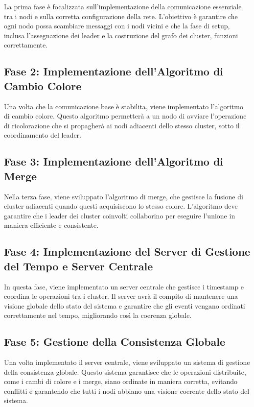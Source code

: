 \documentclass[12pt, a4paper]{report}
\begin{document}
La prima fase \`e focalizzata sull'implementazione della comunicazione essenziale tra i nodi e sulla corretta configurazione della rete. L'obiettivo \`e garantire che ogni nodo possa scambiare messaggi con i nodi vicini e che la fase di setup, inclusa l'assegnazione dei leader e la costruzione del grafo dei cluster, funzioni correttamente.

\subsection*{Fase 2: Implementazione dell'Algoritmo di Cambio Colore}

Una volta che la comunicazione base \`e stabilita, viene implementato l'algoritmo di cambio colore. Questo algoritmo permetter\`a a un nodo di avviare l'operazione di ricolorazione che si propagher\`a ai nodi adiacenti dello stesso cluster, sotto il coordinamento del leader.

\subsection*{Fase 3: Implementazione dell'Algoritmo di Merge}

Nella terza fase, viene sviluppato l'algoritmo di merge, che gestisce la fusione di cluster adiacenti quando questi acquisiscono lo stesso colore. L'algoritmo deve garantire che i leader dei cluster coinvolti collaborino per eseguire l'unione in maniera efficiente e consistente.

\subsection*{Fase 4: Implementazione del Server di Gestione del Tempo e Server Centrale}

In questa fase, viene implementato un server centrale che gestisce i timestamp e coordina le operazioni tra i cluster. Il server avr\`a il compito di mantenere una visione globale dello stato del sistema e garantire che gli eventi vengano ordinati correttamente nel tempo, migliorando così la coerenza globale.

\subsection*{Fase 5: Gestione della Consistenza Globale}

Una volta implementato il server centrale, viene sviluppato un sistema di gestione della consistenza globale. Questo sistema garantisce che le operazioni distribuite, come i cambi di colore e i merge, siano ordinate in maniera corretta, evitando conflitti e garantendo che tutti i nodi abbiano una visione coerente dello stato del sistema.
\end{document}
